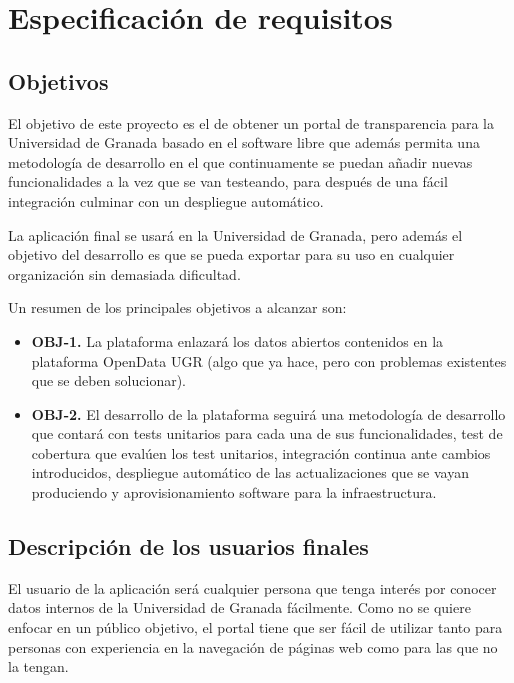 \chapter{Especificación de requisitos}

\section{Objetivos}

El objetivo de este proyecto es el de obtener un portal de transparencia para la Universidad de Granada basado en el software 
libre que además permita una metodología de desarrollo en el que continuamente se puedan añadir nuevas funcionalidades a la 
vez que se van testeando, para después de una fácil integración culminar con un despliegue automático.

\bigskip
La aplicación final se usará en la Universidad de Granada, pero además el objetivo del desarrollo es que se pueda exportar 
para su uso en cualquier organización sin demasiada dificultad.

\bigskip
Un resumen de los principales objetivos a alcanzar son:

\begin{itemize}
  \item \textbf{OBJ-1.} La plataforma enlazará los datos abiertos contenidos en la plataforma OpenData UGR (algo que ya hace, pero con
  problemas existentes que se deben solucionar).
  \item \textbf{OBJ-2.} El desarrollo de la plataforma seguirá una metodología de desarrollo que contará con tests unitarios para cada 
  una de sus funcionalidades, test de cobertura que evalúen los test unitarios, integración continua ante cambios introducidos,
  despliegue automático de las actualizaciones que se vayan produciendo y aprovisionamiento software para la infraestructura.
\end{itemize}
  
\section{Descripción de los usuarios finales}

El usuario de la aplicación será cualquier persona que tenga interés por conocer datos internos de la Universidad de Granada 
fácilmente. Como no se quiere enfocar en un público objetivo, el portal tiene que ser fácil de utilizar tanto para personas 
con experiencia en la navegación de páginas web como para las que no la tengan.

